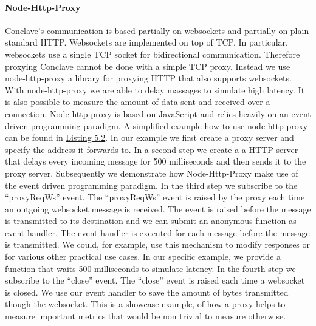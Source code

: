  \paragraph{Node-Http-Proxy}
 Conclave's communication is based partially on websockets and partially on plain standard HTTP.
 Websockets are implemented on top of TCP. In particular, websockets use a single TCP socket for bidirectional communication. Therefore proxying Conclave cannot be done with a simple TCP proxy. Instead we use node-http-proxy a library for proxying HTTP that also supports websockets. With node-http-proxy we are able to delay massages to simulate high latency. It is also possible to measure the amount of data sent and received over a connection.
 Node-http-proxy is based on JavaScript and relies heavily on an event driven programming paradigm. A simplified example how to use node-http-proxy can be found in \hyperref[the_label]{Listing 5.2}. In our example we first create a proxy server and specify the address it forwards to. In a second step we create a a HTTP server that delays every incoming message for 500 milliseconds and then sends it to the proxy server. Subsequently we demonstrate how Node-Http-Proxy make use of the event driven programming paradigm. In the third step we subscribe to the ``proxyReqWs'' event. The ``proxyReqWs'' event is raised by the proxy each time an outgoing websocket message is received. The event is raised before the message is transmitted to its destination and we can submit an anonymous function as event handler. The event handler is executed for each message before the message is transmitted. We could, for example, use this mechanism to modify responses or for various other practical use cases. In our specific example, we provide a function that waits 500 milliseconds to simulate latency. In the fourth step we subscribe to the ``close'' event. The ``close'' event is raised each time a websocket is closed. We use our event handler to save the amount of bytes transmitted though the websocket. This is a showcase example, of how a proxy helps to measure important metrics that would be non trivial to measure otherwise.
  \label{the_label}				
